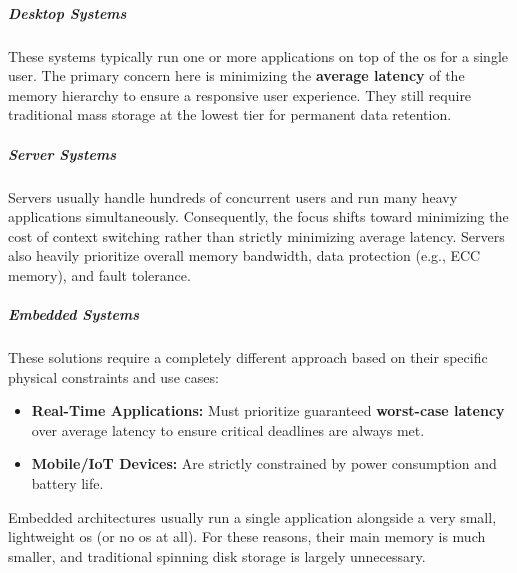 \subparagraph{Desktop Systems} 
These systems typically run one or more applications on top of the \gls{os} for a single user. The primary concern here is minimizing the \textbf{average latency} of the memory hierarchy to ensure a responsive user experience. They still require traditional mass storage at the lowest tier for permanent data retention.

\subparagraph{Server Systems} 
Servers usually handle hundreds of concurrent users and run many heavy applications simultaneously. Consequently, the focus shifts toward minimizing the cost of context switching rather than strictly minimizing average latency. Servers also heavily prioritize overall memory bandwidth, data protection (e.g., ECC memory), and fault tolerance.

\subparagraph{Embedded Systems} 
These solutions require a completely different approach based on their specific physical constraints and use cases:
\begin{itemize}
    \item \textbf{Real-Time Applications:} Must prioritize guaranteed \textbf{worst-case latency} over average latency to ensure critical deadlines are always met.
    \item \textbf{Mobile/IoT Devices:} Are strictly constrained by power consumption and battery life.
\end{itemize}
Embedded architectures usually run a single application alongside a very small, lightweight \gls{os} (or no \gls{os} at all). For these reasons, their main memory is much smaller, and traditional spinning disk storage is largely unnecessary.

\vspace{1em}
\begin{table}[htbp]
    \centering
    \renewcommand{\arraystretch}{1.4}
    \caption{Performance and implementation characteristics across the memory hierarchy.}
\end{table}

